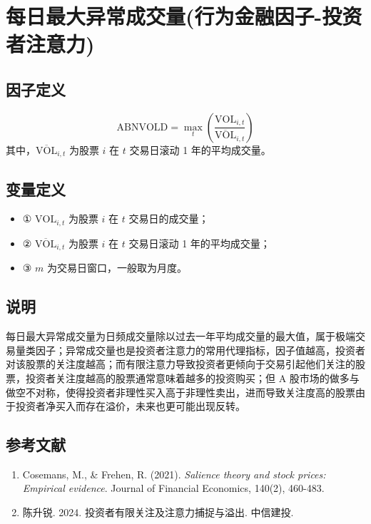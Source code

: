 \documentclass{article}
\begin{document}
\section{每日最大异常成交量(行为金融因子-投资者注意力)}

\subsection{因子定义}
\begin{equation}
    \mathrm{ABNVOLD} = \max_t \left( \frac{\mathrm{VOL}_{i,t}}{\overline{\mathrm{VOL}}_{i,t}} \right)
\end{equation}
其中，\(\overline{\mathrm{VOL}}_{i,t}\) 为股票 \( i \) 在 \( t \) 交易日滚动 1 年的平均成交量。

\subsection{变量定义}
\begin{itemize}
    \item ① \( \mathrm{VOL}_{i,t} \) 为股票 \( i \) 在 \( t \) 交易日的成交量；
    \item ② \( \overline{\mathrm{VOL}}_{i,t} \) 为股票 \( i \) 在 \( t \) 交易日滚动 1 年的平均成交量；
    \item ③ \( m \) 为交易日窗口，一般取为月度。
\end{itemize}

\subsection{说明}
每日最大异常成交量为日频成交量除以过去一年平均成交量的最大值，属于极端交易量类因子；异常成交量也是投资者注意力的常用代理指标，因子值越高，投资者对该股票的关注度越高；而有限注意力导致投资者更倾向于交易引起他们关注的股票，投资者关注度越高的股票通常意味着越多的投资购买；但 A 股市场的做多与做空不对称，使得投资者非理性买入高于非理性卖出，进而导致关注度高的股票由于投资者净买入而存在溢价，未来也更可能出现反转。

\subsection{参考文献}
\begin{enumerate}
    \item Cosemans, M., \& Frehen, R. (2021). \textit{Salience theory and stock prices: Empirical evidence}. Journal of Financial Economics, 140(2), 460-483.
    \item 陈升锐. 2024. 投资者有限关注及注意力捕捉与溢出. 中信建投.
\end{enumerate}
\end{document}
